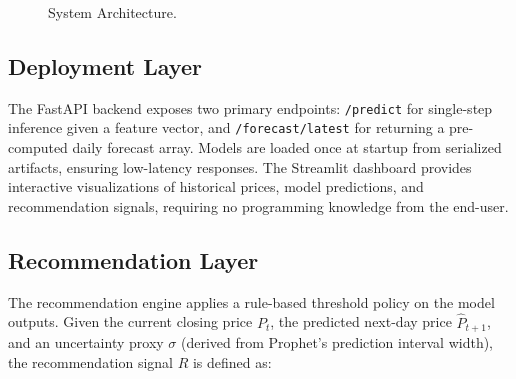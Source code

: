 \documentclass[journal,comsoc]{IEEEtran}
\begin{document}
\begin{figure}[t]
\caption{System Architecture. }
\label{fig:architecture}
\end{figure}

\subsection{Deployment Layer}
The FastAPI backend exposes two primary endpoints: \texttt{/predict} for single-step inference given a feature vector, and \texttt{/forecast/latest} for returning a pre-computed daily forecast array. Models are loaded once at startup from serialized artifacts, ensuring low-latency responses. The Streamlit dashboard provides interactive visualizations of historical prices, model predictions, and recommendation signals, requiring no programming knowledge from the end-user.

\subsection{Recommendation Layer}
The recommendation engine applies a rule-based threshold policy on the model outputs. Given the current closing price $P_t$, the predicted next-day price $\hat{P}_{t+1}$, and an uncertainty proxy $\sigma$ (derived from Prophet's prediction interval width), the recommendation signal $R$ is defined as:
\end{document}
